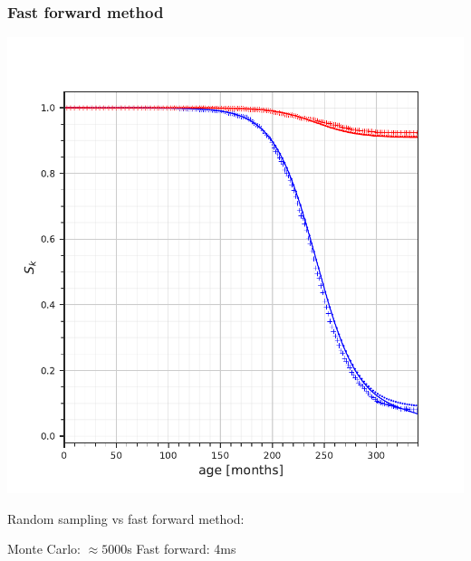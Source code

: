 \documentclass{beamer}
\begin{document}
\begin{frame}
    \frametitle{Fast forward method}

    \begin{center}
    \includegraphics[height=0.8\textheight]{figures/SCurveComparison.pdf}
    \end{center}

    Random sampling vs fast forward method:

    Monte Carlo: $\approx 5000$s
    Fast forward: 4ms
\end{frame}
\end{document}
